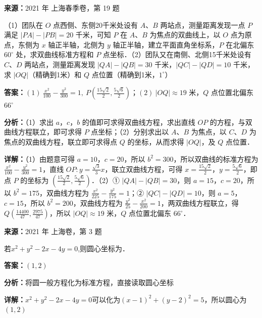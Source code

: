 \begin{question}[points=14]
\textbf{来源：}2021 年 上海春季卷，第 19 题\par
（1）团队在 $O$ 点西侧、东侧20千米处设有 $A$、$B$ 两站点，测量距离发现一点 $P$ 满足 $|PA|-|PB|=20$ 千米，可知 $P$ 在 $A$、$B$ 为焦点的双曲线上，以 $O$ 点为原点，东侧为 $x$ 轴正半轴，北侧为 $y$ 轴正半轴，建立平面直角坐标系，$P$ 在北偏东 $60^\circ$ 处，求双曲线标准方程和 $P$ 点坐标．\newline（2）团队又在南侧、北侧15千米处设有 $C$、$D$ 两站点，测量距离发现 $|QA|-|QB|=30$ 千米，$|QC|-|QD|=10$ 千米，求 $|OQ|$（精确到1米）和 $Q$ 点位置（精确到1米，$1^\circ$）
\begin{solution}
\textbf{答案：}$(1)\ \frac{x^2}{100}-\frac{y^2}{300}=1,\ P(\frac{15\sqrt{2}}{2},\frac{5\sqrt{6}}{2})$；$(2)\ |OQ|\approx 19$ 米，$Q$ 点位置北偏东 $66^\circ$

\textbf{分析：}（1）求出 $a$，$c$，$b$ 的值即可求得双曲线方程，求出直线 $OP$ 的方程，与双曲线方程联立，即可求得 $P$ 点坐标；\newline（2）分别求出以 $A$、$B$ 为焦点，以 $C$、$D$ 为焦点的双曲线方程，联立即可求得点 $Q$ 的坐标，从而求得 $|OQ|$，及 $Q$ 点位置．

\textbf{详解：}（1）由题意可得 $a=10$，$c=20$，所以 $b^2=300$，所以双曲线的标准方程为 $\frac{x^2}{100}-\frac{y^2}{300}=1$，直线 $OP:y=\frac{\sqrt{3}}{3}x$，联立双曲线方程，可得 $x=\frac{15\sqrt{2}}{2}$，$y=\frac{5\sqrt{6}}{2}$，即点 $P$ 的坐标为 $(\frac{15\sqrt{2}}{2},\frac{5\sqrt{6}}{2})$．\newline（2）① $|QA|-|QB|=30$，则 $a=15$，$c=20$，所以 $b^2=175$，双曲线方程为 $\frac{x^2}{225}-\frac{y^2}{175}=1$；② $|QC|-|QD|=10$，则 $a=5$，$c=15$，所以 $b^2=200$，双曲线方程为 $\frac{y^2}{25}-\frac{x^2}{200}=1$，两双曲线方程联立，得 $Q(\frac{14400}{47},\frac{2975}{47})$，所以 $|OQ|\approx 19$ 米，$Q$ 点位置北偏东 $66^\circ$．
\end{solution}
\end{question}

\begin{question}[points=4]
\textbf{来源：}2021 年 上海卷，第 3 题\par
若$x^2+y^2-2x-4y=0$,则圆心坐标为．
\fillin[{$(1,2)$}]
\begin{solution}
\textbf{答案：}$(1,2)$

\textbf{分析：}将圆一般方程化为标准方程，直接读取圆心坐标

\textbf{详解：}$x^2+y^2-2x-4y=0$可以化为$(x-1)^2+(y-2)^2=5$，所以圆心为$(1,2)$
\end{solution}
\end{question}

